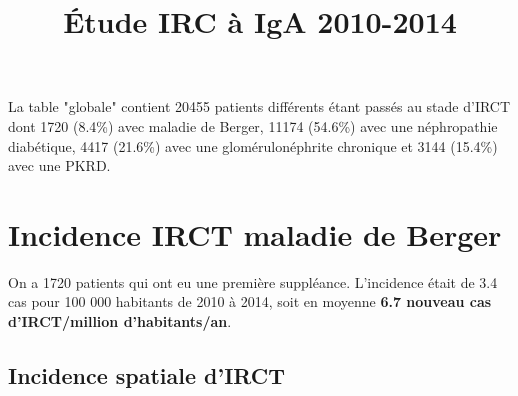 \documentclass[11pt,a4paper]{article}\usepackage[]{graphicx}\usepackage[]{color}
\title{Étude IRC à IgA 2010-2014}
\begin{document}
\maketitle

\tableofcontents

\newpage





La table "globale" contient 20455 patients différents étant passés au stade d'IRCT dont 1720 (8.4\%) avec maladie de Berger, 11174 (54.6\%) avec une néphropathie diabétique, 4417 (21.6\%) avec une glomérulonéphrite chronique et 3144 (15.4\%) avec une PKRD.

\section{Incidence IRCT maladie de Berger}

On a 1720 patients qui ont eu une première suppléance. L'incidence était de 3.4 cas pour 100 000 habitants de 2010 à 2014, soit en moyenne \textbf{6.7 nouveau cas d'IRCT/million d'habitants/an}. %

  \subsection{Incidence spatiale d'IRCT}
\end{document}
